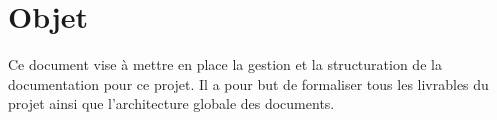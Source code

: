 \section{Objet}

Ce document vise à mettre en place la gestion et la structuration de la documentation pour ce projet.
Il a pour but de formaliser tous les livrables du projet ainsi que l'architecture globale des documents.
